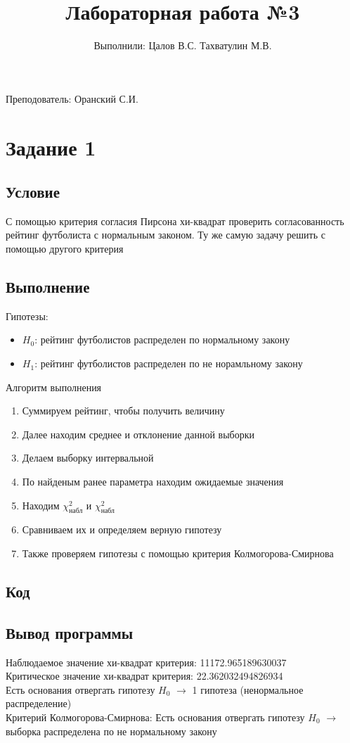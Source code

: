\documentclass{article}
\title{Лабораторная работа №3}
\author{Выполнили: Цалов В.С. Тахватулин М.В.}
\begin{document}
\maketitle
\begin{center}
      {\fontsize{14}{15}\selectfont
            Преподователь: Оранский С.И.
      }
\end{center}
\section{Задание 1}
\subsection{Условие}
С помощью критерия согласия Пирсона хи-квадрат проверить согласованность
рейтинг футболиста с нормальным законом. Ту же самую задачу решить с помощью другого
критерия
\subsection{Выполнение}
Гипотезы: 
\begin{itemize}
      \item $H_0$: рейтинг футболистов распределен по нормальному закону
      \item $H_1$: рейтинг футболистов распределен по не норамльному закону
\end{itemize}
Алгоритм выполнения
\begin{enumerate}
      \item Суммируем рейтинг, чтобы получить величину
      \item Далее находим среднее и отклонение данной выборки
      \item Делаем выборку интервальной
      \item По найденым ранее параметра находим ожидаемые значения
      \item Находим $ \chi^2_{\text{набл}} $ и $ \chi^2_{\text{набл}} $
      \item Сравниваем их и определяем верную гипотезу
      \item Также проверяем гипотезы с помощью критерия Колмогорова-Смирнова
\end{enumerate}
\subsection{Код}
\subsection{Вывод программы}
Наблюдаемое значение хи-квадрат критерия: 11172.965189630037 \\ 
Критическое значение хи-квадрат критерия: 22.362032494826934 \\ 
Есть основания отвергать гипотезу $H_0$ $\rightarrow$ 1 гипотеза (ненормальное распределение) \\
Критерий Колмогорова-Смирнова:
Есть основания отвергать гипотезу $H_0$ $\rightarrow$ выборка распределена по не нормальному закону
\end{document}
